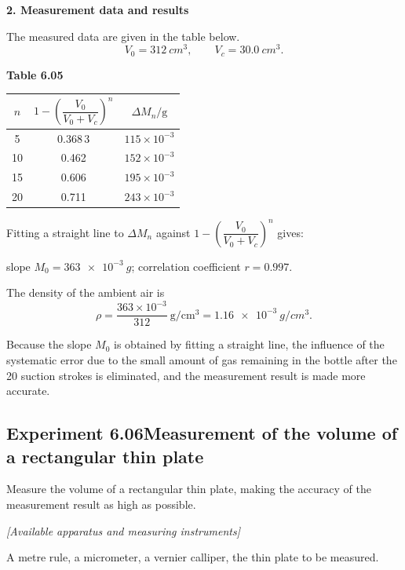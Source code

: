 \textbf{2. Measurement data and results}

The measured data are given in the table below.
\begin{equation*}
V_0=\SI{312}{cm^3},\qquad V_c=\SI{30.0}{cm^3}.
\end{equation*}

\begin{center}
\textbf{Table 6.05}\\[3pt]
\begin{tabular}{ccc}
\toprule
$n$ & $1-\left(\dfrac{V_0}{V_0+V_c}\right)^{n}$ & $\Delta M_n/\mathrm{g}$\\
\midrule
5  & 0.368\,3 & $115\times10^{-3}$\\
10 & 0.462   & $152\times10^{-3}$\\
15 & 0.606   & $195\times10^{-3}$\\
20 & 0.711   & $243\times10^{-3}$\\
\bottomrule
\end{tabular}
\end{center}

Fitting a straight line to $\Delta M_n$ against $1-\left(\dfrac{V_0}{V_0+V_c}\right)^{n}$ gives:

slope $M_0=\SI{363e-3}{g}$; correlation coefficient $r=0.997$.

The density of the ambient air is
\begin{equation*}
\rho=\frac{363\times10^{-3}}{312}\ \mathrm{g/cm^3}=\SI{1.16e-3}{g/cm^3}.
\end{equation*}

\begin{commentary}
Because the slope $M_0$ is obtained by fitting a straight line, the influence of the systematic error due to the small amount of gas remaining in the bottle after the 20 suction strokes is eliminated, and the measurement result is made more accurate.
\end{commentary}

\subsection*{Experiment 6.06\quad Measurement of the volume of a rectangular thin plate}

Measure the volume of a rectangular thin plate, making the accuracy of the measurement result as high as possible.

\noindent\textit{[Available apparatus and measuring instruments]}

A metre rule, a micrometer, a vernier calliper, the thin plate to be measured.

